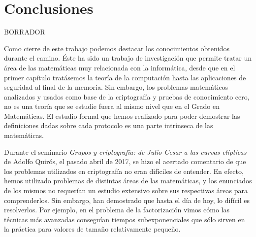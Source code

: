 













\chapter*{Conclusiones}

BORRADOR

Como cierre de este trabajo podemos destacar los conocimientos obtenidos durante el camino. Éste ha sido un trabajo de investigación que permite tratar un área de las matemáticas muy relacionada con la informática, desde que en el primer capítulo tratásemos la teoría de la computación hasta las aplicaciones de seguridad al final de la memoria. Sin embargo, los problemas matemáticos analizados y usados como base de la criptografía y pruebas de conocimiento cero, no es una teoría que se estudie fuera al mismo nivel que en el Grado en Matemáticas. El estudio formal que hemos realizado para poder demostrar las definiciones dadas sobre cada protocolo es una parte intrínseca de las matemáticas.
 
 
Durante el seminario \textit{Grupos y criptograf\'ia: de Julio Cesar a las curvas el\'ipticas} de Adolfo Quirós, el pasado abril de 2017, se hizo el acertado comentario de que los problemas utilizados en criptografía no eran difíciles de entender. En efecto, hemos utilizado problemas de distintas áreas de las matemáticas, y los enunciados de los mismos no requerían un estudio extensivo sobre sus respectivas áreas para comprenderlos. Sin embargo, han demostrado que hasta el día de hoy, lo difícil es resolverlos. Por ejemplo, en el problema de la factorización vimos cómo las técnicas más avanzadas conseguían tiempos subexponenciales que sólo sirven en la práctica para valores de tamaño relativamente pequeño.

